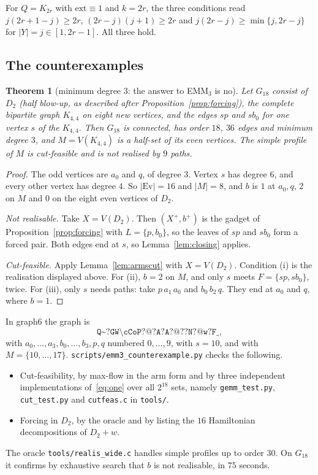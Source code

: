 \documentclass[11pt]{amsart}
\newtheorem{theorem}{Theorem}
\theoremstyle{definition}
\newcommand{\Ev}{\mathrm{Ev}}
\begin{document}
For $Q=K_{2r}$ with $\mathrm{ext}\equiv1$ and $k=2r$, the three conditions read
$j(2r+1-j)\ge2r$, $(2r-j)(j+1)\ge2r$ and $j(2r-j)\ge\min\{j,2r-j\}$ for $|Y|=j\in[1,2r-1]$. All
three hold.

\subsection{The counterexamples}

\begin{theorem}[minimum degree $3$: the answer to EMM$_3$ is no]\label{thm:emm3false}
Let $G_{18}$ consist of $D_2$ (half blow-up, as described after Proposition~\ref{prop:forcing}),
the complete bipartite graph $K_{4,4}$ on eight new vertices, and the edges $sp$ and $sb_0$ for one
vertex $s$ of the $K_{4,4}$. Then $G_{18}$ is connected, has order $18$, $36$ edges and minimum degree
$3$, and $M=V(K_{4,4})$ is a half-set of its even vertices. The simple profile of $M$ is cut-feasible
and is not realised by $9$ paths.
\end{theorem}

\begin{proof}
The odd vertices are $a_0$ and $q$, of degree $3$. Vertex $s$ has degree $6$, and every other vertex
has degree $4$. So $|\Ev|=16$ and $|M|=8$, and $b$ is $1$ at $a_0,q$, $2$ on $M$ and $0$ on the eight
even vertices of $D_2$.

\emph{Not realisable.} Take $X=V(D_2)$. Then $(X^+,b^+)$ is the gadget of
Proposition~\ref{prop:forcing} with $L=\{p,b_0\}$, so the leaves of $sp$ and $sb_0$ form a forced pair.
Both edges end at $s$, so Lemma~\ref{lem:closing} applies.

\emph{Cut-feasible.} Apply Lemma~\ref{lem:armscut} with $X=V(D_2)$. Condition (i) is the realisation
displayed above. For (ii), $b=2$ on $M$, and only $s$ meets $F=\{sp,sb_0\}$, twice. For (iii), only
$s$ needs paths: take $p\,a_1\,a_0$ and $b_0\,b_2\,q$. They end at $a_0$ and $q$, where $b=1$.
\end{proof}

In graph6 the graph is
\[\texttt{Q\textasciitilde?GW\textbackslash cCoP?@?A?A?@??N?@w?F\_},\]
with $a_0,\dots,a_3,b_0,\dots,b_3,p,q$ numbered $0,\dots,9$, with $s=10$, and with
$M=\{10,\dots,17\}$.
\texttt{scripts/emm3\_counterexample.py} checks the following.
\begin{itemize}
\item Cut-feasibility, by max-flow in the arm form and by three independent implementations
of~\eqref{eq:one} over all $2^{18}$ sets, namely \texttt{gemm\_test.py}, \texttt{cut\_test.py} and
\texttt{cutfeas.c} in \texttt{tools/}.
\item Forcing in $D_2$, by the oracle and by listing the $16$ Hamiltonian decompositions of $D_2+w$.
\end{itemize}
The oracle \texttt{tools/realis\_wide.c} handles simple profiles up to order $30$. On $G_{18}$ it
confirms by exhaustive search that $b$ is not realisable, in $75$ seconds.
\end{document}
